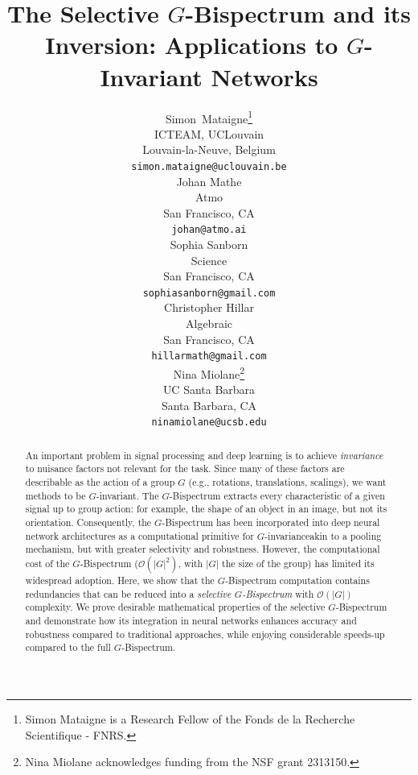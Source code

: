 \documentclass{article}
\title{The Selective $G$-Bispectrum and its Inversion: Applications to $G$-Invariant Networks}
\author{%
  Simon~Mataigne\thanks{Simon Mataigne is a Research Fellow of the Fonds de la Recherche Scientifique - FNRS.%
  } \\
  ICTEAM, UCLouvain\\
  Louvain-la-Neuve, Belgium \\
  \texttt{simon.mataigne@uclouvain.be} \\
   \And
   Johan Mathe\\
  Atmo\\
  San Francisco, CA\\
   \texttt{johan@atmo.ai} \\
  \AND
   Sophia Sanborn \\
  Science \\
  San Francisco, CA\\
\texttt{sophiasanborn@gmail.com} \\
  \And
  Christopher Hillar\\
  Algebraic\\
  San Francisco, CA\\
   \texttt{hillarmath@gmail.com} \\
   \And
   Nina Miolane\thanks{Nina Miolane acknowledges funding from the NSF grant 2313150.} \\
   UC Santa Barbara\\
  Santa Barbara, CA\\
   \texttt{ninamiolane@ucsb.edu} \\
}
\theoremstyle{plain}
\theoremstyle{definition}
\theoremstyle{remark}
\begin{document}
\maketitle


\begin{abstract}


An important problem in signal processing and deep learning is to achieve \textit{invariance} to nuisance factors not relevant for the task. Since many of these factors are describable as the action of a group $G$ (e.g., rotations, translations, scalings), we want methods to be $G$-invariant. The $G$-Bispectrum extracts every characteristic of a given signal up to group action: for example, the shape of an object in an image, but not its orientation. Consequently, the $G$-Bispectrum has been incorporated into deep neural network architectures as a computational primitive for $G$-invariance\textemdash akin to a pooling mechanism, but with greater selectivity and robustness. However, the computational cost of the $G$-Bispectrum ($\mathcal{O}(|G|^2)$, with $|G|$ the size of the group) has limited its widespread adoption. Here, we show that the $G$-Bispectrum computation contains redundancies that can be reduced into a \textit{selective $G$-Bispectrum} with $\mathcal{O}(|G|)$ complexity. We prove desirable mathematical properties of the selective $G$-Bispectrum and demonstrate how its integration in neural networks enhances accuracy and robustness compared to traditional approaches, while enjoying considerable speeds-up compared to the full $G$-Bispectrum.


\end{abstract}
\end{document}

